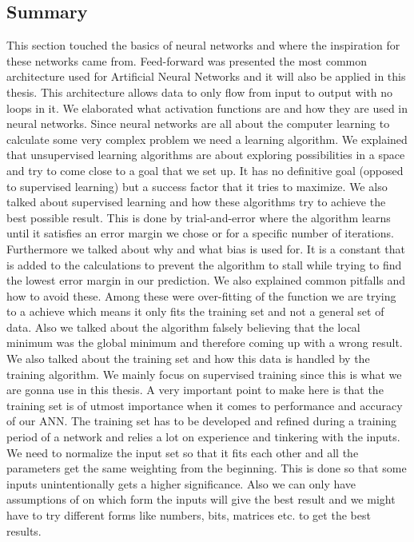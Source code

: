\subsection{Summary}
This section touched the basics of neural networks and where the inspiration for these networks came from. Feed-forward was presented the most common architecture used for Artificial Neural Networks and  it will also be applied in this thesis. This architecture allows data to only flow from input to output with no loops in it. We elaborated what activation functions are and how they are used in neural networks. Since neural networks are all about the computer learning to calculate some very complex problem we need a learning algorithm. We explained that unsupervised learning algorithms are about exploring possibilities in a space and try to come close to a goal that we set up. It has no definitive goal (opposed to supervised learning) but a success factor that it tries to maximize. We also talked about supervised learning and how these algorithms try to achieve the best possible result. This is done by trial-and-error where the algorithm learns until it satisfies an error margin we chose or for a specific number of iterations. Furthermore we talked about why and what bias is used for. It is a constant that is added to the calculations to prevent the algorithm to stall while trying to find the lowest error margin in our prediction. We also explained common pitfalls and how to avoid these. Among these were over-fitting of the function we are trying to a achieve which means it only fits the training set and not a general set of data. Also we talked about the algorithm falsely believing that the local minimum was the global minimum and therefore coming up with a wrong result.
We also talked about the training set and how this data is handled by the training algorithm. We mainly focus on supervised training since this is what we are gonna use in this thesis. A very important point to make here is that the training set is of utmost importance when it comes to performance and accuracy of our ANN. The training set has to be developed and refined during a training period of a network and relies a lot on experience and tinkering with the inputs. We need to normalize the input set so that it fits each other and all the parameters get the same weighting from the beginning. This is done so that some inputs unintentionally gets a higher significance. Also we can only have assumptions of on which form the inputs will give the best result and we might have to try different forms like numbers, bits, matrices etc. to get the best results.